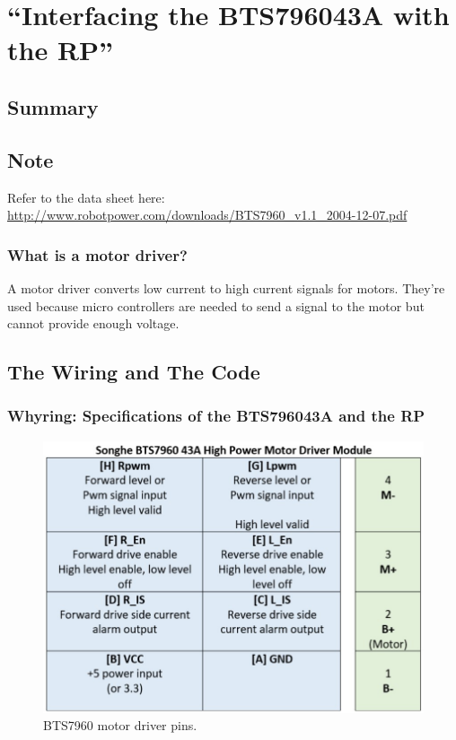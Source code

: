 \documentclass[a4paper, 10pt]{article}
\begin{document}
\pagebreak

\section{``Interfacing the BTS796043A with the RP''}
    \subsection*{Summary}

    \subsection*{Note}
    Refer to the data sheet here: \\ \url{http://www.robotpower.com/downloads/BTS7960_v1.1_2004-12-07.pdf}

    \subsubsection{What is a motor driver?}
        A motor driver converts low current to high current signals for motors. They're used because micro controllers are needed to send a signal to the motor  but cannot provide enough voltage. 

    \subsection{The Wiring and The Code}
    \subsubsection{Whyring: Specifications of the BTS796043A and the RP}

    \begin{figure}[!htb]
    \centering
    \includegraphics[width=\linewidth]{media/bts7960_pins.jpg}
    \caption{BTS7960 motor driver pins.}
    \label{fig:bts7960_pins}
    \end{figure}
    \newline
    
\end{document}
